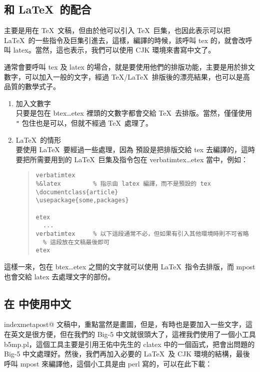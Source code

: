 \subsection{和 \LaTeX\ 的配合}

\MP{} 主要是用在 \TeX\ 文稿，但由於他可以引入 \TeX\ 巨集，也因此表示可以把 \LaTeX\ 的一些指令及巨集引進去，這樣，編譯的時候，該呼叫 {\ttfamily tex} 的，就會改呼叫 {\ttfamily latex}。當然，這也表示，我們可以使用 {\sffamily CJK} 環境來書寫中文了。

通常會要呼叫 {\ttfamily tex} 及 {\ttfamily latex} 的場合，就是要使用他們的排版功能，主要是用於排文數字，可以加入一般的文字，經過 \TeX/\LaTeX\ 排版後的漂亮結果，也可以是高品質的數學式子。

\begin{enumerate}
  \item 加入文數字\\
        只要是包在 {\ttfamily btex}\dots{\ttfamily etex} 裡頭的文數字都會交給 \TeX\ 去排版。當然，僅僅使用 \verb|"| 包住也是可以，但就不經過 \TeX\ 處理了。

  \item \LaTeX\ 的情形\\
        要使用 \LaTeX\ 要經過一些處理，因為 \MP{} 預設是把排版交給 {\ttfamily tex} 去編譯的，這時要把所需要用到的 \LaTeX\ 巨集及指令包在 {\ttfamily verbatimtex}\dots{\ttfamily etex} 當中，例如：

        \begin{quote}
          \begin{verbatim}
verbatimtex
%&latex         % 指示由 latex 編譯，而不是預設的 tex
\documentclass{article}
\usepackage{some,packages}

etex
  ...
verbatimtex     % 以下這段通常不必，但如果有引入其他環境時則不可省略
  % 這段放在文稿最後即可
etex
\end{verbatim}
        \end{quote}
\end{enumerate}

這樣一來，包在 {\ttfamily btex}\dots{\ttfamily etex} 之間的文字就可以使用 \LaTeX\ 指令去排版，而 {\ttfamily mpost} 也會交給 {\ttfamily latex} 去處理文字的部份。

\subsection{在 \MP{} 中使用中文}
\label{subsec:b5mp}

\MP{}index{metapost@\MP} 文稿中，重點當然是畫圖，但是，有時也是要加入一些文字，這在英文是很方便，但在我們的 Big-5 中文就很頭大了，這裡我們使用了一個小工具 {\ttfamily b5mp.pl}，這個工具主要是引用王佑中\cite{clinux}先生的 {\ttfamily clatex} 中的一個函式，把會出問題的 Big-5 中文處理好。然後，我們再加入必要的 \LaTeX\ 及 {\sffamily CJK} 環境的結構，最後呼叫 {\ttfamily mpost} 來編譯他，這個小工具是由 {\sffamily perl} 寫的，可以在此下載：

